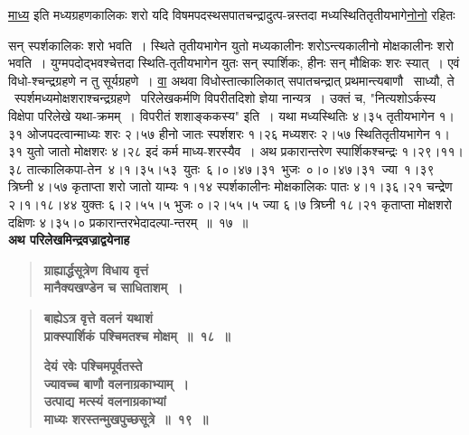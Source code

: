 \documentclass[11pt, openany]{book}
\begin{document}
\hyperref[4.17]{माध्य} इति मध्यग्रहणकालिकः शरो यदि विषमपदस्थसपातचन्द्रादुत्प-न्नस्तदा मध्यस्थितितृतीयभागे\hyperref[4.17]{नोनो} रहितः

\newpage
\noindent सन् \;स्पर्शकालिकः \;शरो \;भवति~। स्थिते \;तृतीयभागेन \;युतो \;मध्यकालीनः शरोऽन्त्यकालीनो मोक्षकालीनः शरो भवति~। युग्मपदोद्भवश्चेत्तदा स्थिति-तृतीयभागेन युतः सन् स्पार्शिकः, हीनः सन् मौक्षिकः शरः स्यात्~। एवं विधो-श्चन्द्रग्रहणे न तु सूर्यग्रहणे~। \hyperref[4.17]{वा} अथवा विधोस्तात्कालिकात् सपातचन्द्रात् प्रथमान्त्यबाणौ ~साध्यौ, ते ~स्पर्शमध्यमोक्षशराश्चन्द्रग्रहणे ~परिलेखकर्मणि विपरीतदिशो ज्ञेया नान्यत्र~। उक्तं च, {\color{violet}"नित्यशोऽर्कस्य विक्षेपा परिलेखे यथा-क्रमम्~। विपरीतं शशाङ्ककस्य"} इति~। यथा मध्यस्थितिः ४।३५ तृतीयभागेन १।३१ ओजपदत्वान्माध्यः शरः २।५७ हीनो जातः स्पर्शशरः १।२६ मध्यशरः २।५७ स्थितितृतीयभागेन १।३१ युतो जातो मोक्षशरः ४।२८ इदं कर्म माध्य-शरस्यैव~। अथ प्रकारान्तरेण स्पार्शिकश्चन्द्रः १।२९।११।३८ तात्कालिकपा-तेन \,४।१।३५।५३ \,युतः \,६।०।४७।३१ \,भुजः \,०।०।४७।३१ \,ज्या \,१।३९ \,त्रिघ्नी ४।५७ कृताप्ता शरो जातो याम्यः १।१४ स्पर्शकालीनः मोक्षकालिकः पातः ४।१।३६।२१ चन्द्रेण २।१।१८।४४ युक्तः ६।२।५५।५ भुजः ०।२।५५।५ ज्या ६।७ त्रिघ्नी १८।२१ कृताप्ता मोक्षशरो दक्षिणः ४।३५।० प्रकारान्तरभेदादल्पा-न्तरम्~॥~१७~॥ \\

{\small \textbf{अथ परिलेखमिन्द्रवज्राद्वयेनाह\textendash }}

 \label{4.18}
\begin{quote}
{\large \textbf{{\color{purple}ग्राह्यार्द्धसूत्रेण विधाय वृत्तं \\
मानैक्यखण्डेन च साधिताशम्~।}}}
\end{quote}

\newpage

 \label{4.19}
\begin{quote}
{\large \textbf{{\color{purple}बाह्येऽत्र वृत्ते वलनं यथाशं \\
प्राक्स्पार्शिकं पश्चिमतश्च मोक्षम्~॥~१८~॥}}
\vspace{1mm}

\textbf{{\color{purple}देयं रवेः पश्चिमपूर्वतस्ते \\
ज्यावच्च बाणौ वलनाग्रकाभ्याम्~। \\
उत्पाद्य मत्स्यं वलनाग्रकाभ्यां \\
माध्यः शरस्तन्मुखपुच्छसूत्रे~॥~१९~॥}}}
\end{quote}
\end{document}

